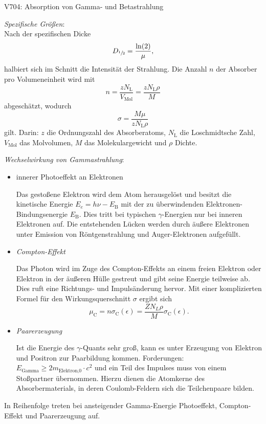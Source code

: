 \begin{Versuch}{V704: Absorption von Gamma- und Betastrahlung}
\begin{Theorie}
			\emph{Spezifische Größen}:\\
			Nach der spezifischen Dicke
			\begin{equation}
				D_{\sfrac{1}{2}}=\frac{\ln(2)}{\mu},
			\end{equation}
			halbiert sich im Schnitt die Intensität der Strahlung.
			Die Anzahl $n$ der Absorber pro Volumeneinheit wird mit
			\begin{equation}
				n=\frac{zN_\text{L}}{V_\text{Mol}}=\frac{zN_\text{L}\rho}{M}
			\end{equation}
			abgeschätzt, wodurch 
			\begin{equation}
				\sigma=\frac{M\mu}{zN_\text{L}\rho}
				\label{eq:Wirkungsquerschnitt}
			\end{equation}
			gilt.
			Darin: $z$ die Ordnungszahl des Absorberatoms, $N_\text{L}$ die Loschmidtsche Zahl, $V_\text{Mol}$ das Molvolumen, $M$ das Molekulargewicht und $\rho$ Dichte.

			\emph{Wechselwirkung von Gammastrahlung}:
			\begin{itemize}
				\item{innerer Photoeffekt an Elektronen}

				Das gestoßene Elektron wird dem Atom herausgelöst und besitzt die kinetische Energie $E_e=h\nu-E_\text{B}$ mit der zu überwindenden Elektronen-Bindungsenergie $E_\text{B}$. 
				Dies tritt bei typischen $\gamma$-Energien nur bei inneren Elektronen auf. 
				Die entstehenden Lücken werden durch äußere Elektronen unter Emission von Röntgenstrahlung und Auger-Elektronen aufgefüllt.
				\item{\emph{Compton-Effekt}}

				Das Photon wird im Zuge des Compton-Effekts an einem freien Elektron oder Elektron in der äußeren Hülle gestreut und gibt seine Energie teilweise ab. 
				Dies ruft eine Richtungs- und Impulsänderung hervor.
				Mit einer komplizierten Formel für den Wirkungsquerschnitt $\sigma$ ergibt sich
				\begin{equation}
					\mu_\text{C}=n\sigma_\text{C}(\epsilon)=\frac{Z N_L \rho}{M}\sigma_\text{C}(\epsilon).
				\label{eq:mu_c}
				\end{equation}
				\item{\emph{Paarerzeugung}}

				Ist die Energie des $\gamma$-Quants sehr groß, kann es unter Erzeugung von Elektron und Positron zur Paarbildung kommen.
				Forderungen: $E_\text{Gamma}\ge 2m_\text{Elektron,0}\cdot c^2$ und ein Teil des Impulses muss von einem Stoßpartner übernommen.
				Hierzu dienen die Atomkerne des Absorbermaterials, in  deren Coulomb-Feldern  sich die  Teilchenpaare bilden.
			\end{itemize}
			In Reihenfolge treten bei ansteigender Gamma-Energie Photoeffekt, Compton-Effekt und Paarerzeugung auf.


\end{Theorie}
\end{Versuch}

